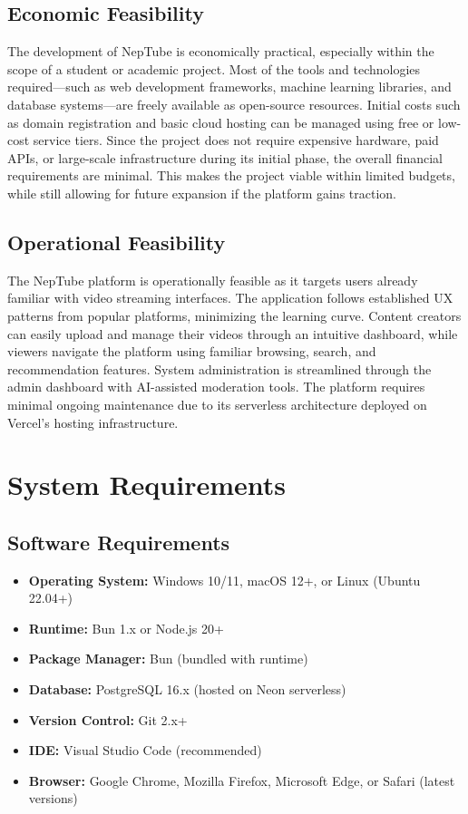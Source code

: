\subsection{Economic Feasibility}

The development of NepTube is economically practical, especially within the scope of a student or academic project. Most of the tools and technologies required---such as web development frameworks, machine learning libraries, and database systems---are freely available as open-source resources. Initial costs such as domain registration and basic cloud hosting can be managed using free or low-cost service tiers. Since the project does not require expensive hardware, paid APIs, or large-scale infrastructure during its initial phase, the overall financial requirements are minimal. This makes the project viable within limited budgets, while still allowing for future expansion if the platform gains traction.

\subsection{Operational Feasibility}

The NepTube platform is operationally feasible as it targets users already familiar with video streaming interfaces. The application follows established UX patterns from popular platforms, minimizing the learning curve. Content creators can easily upload and manage their videos through an intuitive dashboard, while viewers navigate the platform using familiar browsing, search, and recommendation features. System administration is streamlined through the admin dashboard with AI-assisted moderation tools. The platform requires minimal ongoing maintenance due to its serverless architecture deployed on Vercel's hosting infrastructure.

\section{System Requirements}

\subsection{Software Requirements}

\begin{itemize}[leftmargin=2cm]
  \item \textbf{Operating System:} Windows 10/11, macOS 12+, or Linux (Ubuntu 22.04+)
  \item \textbf{Runtime:} Bun 1.x or Node.js 20+
  \item \textbf{Package Manager:} Bun (bundled with runtime)
  \item \textbf{Database:} PostgreSQL 16.x (hosted on Neon serverless)
  \item \textbf{Version Control:} Git 2.x+
  \item \textbf{IDE:} Visual Studio Code (recommended)
  \item \textbf{Browser:} Google Chrome, Mozilla Firefox, Microsoft Edge, or Safari (latest versions)
\end{itemize}

